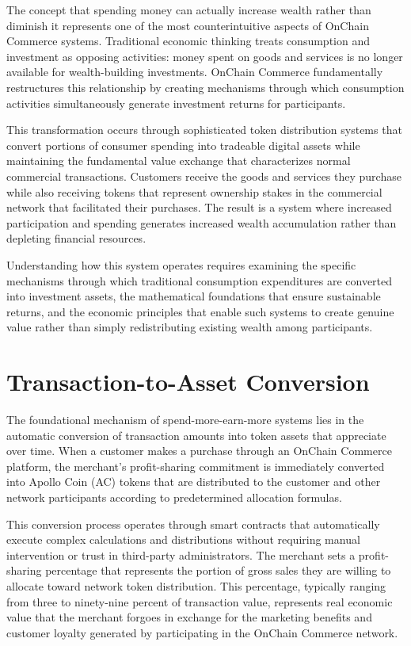 \documentclass[
  Letterpaper,
]{scrbook}
\begin{document}
The concept that spending money can actually increase wealth rather than
diminish it represents one of the most counterintuitive aspects of
OnChain Commerce systems. Traditional economic thinking treats
consumption and investment as opposing activities: money spent on goods
and services is no longer available for wealth-building investments.
OnChain Commerce fundamentally restructures this relationship by
creating mechanisms through which consumption activities simultaneously
generate investment returns for participants.

This transformation occurs through sophisticated token distribution
systems that convert portions of consumer spending into tradeable
digital assets while maintaining the fundamental value exchange that
characterizes normal commercial transactions. Customers receive the
goods and services they purchase while also receiving tokens that
represent ownership stakes in the commercial network that facilitated
their purchases. The result is a system where increased participation
and spending generates increased wealth accumulation rather than
depleting financial resources.

Understanding how this system operates requires examining the specific
mechanisms through which traditional consumption expenditures are
converted into investment assets, the mathematical foundations that
ensure sustainable returns, and the economic principles that enable such
systems to create genuine value rather than simply redistributing
existing wealth among participants.

\section{Transaction-to-Asset
Conversion}\label{transaction-to-asset-conversion}

The foundational mechanism of spend-more-earn-more systems lies in the
automatic conversion of transaction amounts into token assets that
appreciate over time. When a customer makes a purchase through an
OnChain Commerce platform, the merchant's profit-sharing commitment is
immediately converted into Apollo Coin (AC) tokens that are distributed
to the customer and other network participants according to
predetermined allocation formulas.

This conversion process operates through smart contracts that
automatically execute complex calculations and distributions without
requiring manual intervention or trust in third-party administrators.
The merchant sets a profit-sharing percentage that represents the
portion of gross sales they are willing to allocate toward network token
distribution. This percentage, typically ranging from three to
ninety-nine percent of transaction value, represents real economic value
that the merchant forgoes in exchange for the marketing benefits and
customer loyalty generated by participating in the OnChain Commerce
network.
\end{document}

